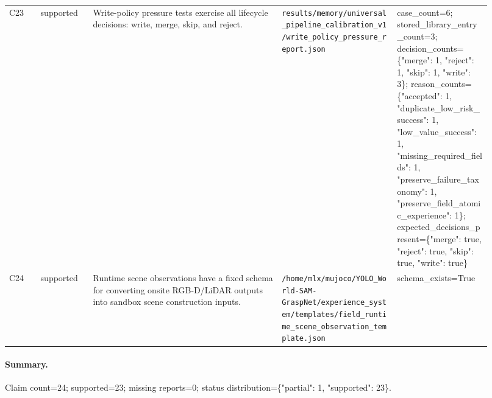 \begin{table}[t]
\begin{tabular}{p{0.06\linewidth}p{0.10\linewidth}p{0.36\linewidth}p{0.22\linewidth}p{0.18\linewidth}}
C23 & supported & Write-policy pressure tests exercise all lifecycle decisions: write, merge, skip, and reject. & \texttt{results/memory/universal\_pipeline\_calibration\_v1/write\_policy\_pressure\_report.json} & case\_count=6; stored\_library\_entry\_count=3; decision\_counts=\{"merge": 1, "reject": 1, "skip": 1, "write": 3\}; reason\_counts=\{"accepted": 1, "duplicate\_low\_risk\_success": 1, "low\_value\_success": 1, "missing\_required\_fields": 1, "preserve\_failure\_taxonomy": 1, "preserve\_field\_atomic\_experience": 1\}; expected\_decisions\_present=\{"merge": true, "reject": true, "skip": true, "write": true\} \\
C24 & supported & Runtime scene observations have a fixed schema for converting onsite RGB-D/LiDAR outputs into sandbox scene construction inputs. & \texttt{/home/mlx/mujoco/YOLO\_World-SAM-GraspNet/experience\_system/templates/field\_runtime\_scene\_observation\_template.json} & schema\_exists=True \\
\hline
\end{tabular}
\end{table}

\paragraph{Summary.}
Claim count=24; supported=23; missing reports=0; status distribution=\{"partial": 1, "supported": 23\}.

